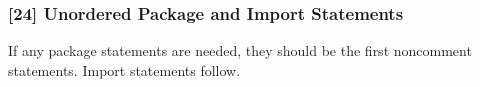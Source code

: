 \subsubsection{[24] Unordered Package and Import Statements}
If any package statements are needed, they should be the first noncomment statements. Import statements follow.